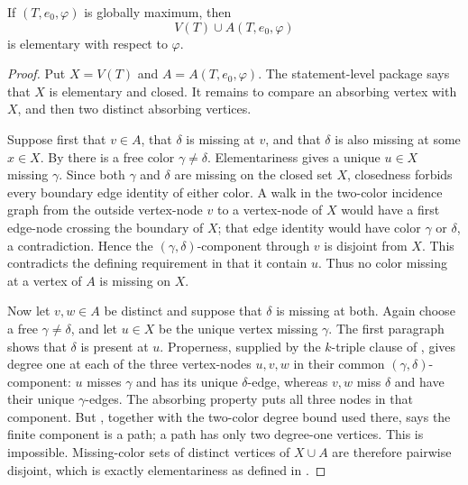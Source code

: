\begin{lemma}
If $(T,e_0,\varphi)$ is globally maximum, then
\[
  V(T)\cup A(T,e_0,\varphi)
\]
is elementary with respect to $\varphi$.
\end{lemma}
\begin{proof}
Put $X=V(T)$ and $A=A(T,e_0,\varphi)$.  The statement-level package
 says that $X$ is elementary and closed.
It remains to compare an absorbing vertex with $X$, and then two distinct
absorbing vertices.

Suppose first that $v\in A$, that $\delta$ is missing at $v$, and that
$\delta$ is also missing at some $x\in X$.  By
 there is a free color
$\gamma\ne\delta$.  Elementariness gives a unique $u\in X$ missing
$\gamma$.  Since both $\gamma$ and $\delta$ are missing on the closed set
$X$, closedness forbids every boundary edge identity of either color.  A
walk in the two-color incidence graph from the outside vertex-node $v$ to
a vertex-node of $X$ would have a first edge-node crossing the boundary of
$X$; that edge identity would have color $\gamma$ or $\delta$, a
contradiction.  Hence the $(\gamma,\delta)$-component through $v$ is
disjoint from $X$.  This contradicts the defining requirement in
 that it contain $u$.  Thus no color missing at a
vertex of $A$ is missing on $X$.

Now let $v,w\in A$ be distinct and suppose that $\delta$ is missing at
both.  Again choose a free $\gamma\ne\delta$, and let $u\in X$ be the
unique vertex missing $\gamma$.  The first paragraph shows that $\delta$
is present at $u$.  Properness, supplied by the $k$-triple clause of
, gives degree one at each of the three
vertex-nodes $u,v,w$ in their common $(\gamma,\delta)$-component: $u$
misses $\gamma$ and has its unique $\delta$-edge, whereas $v,w$ miss
$\delta$ and have their unique $\gamma$-edges.  The absorbing property
puts all three nodes in that component.  But
, together with the two-color
degree bound used there, says the finite component is a path; a path has
only two degree-one vertices.  This is impossible.  Missing-color sets of
distinct vertices of $X\cup A$ are therefore pairwise disjoint, which is
exactly elementariness as defined in
.
\end{proof}
